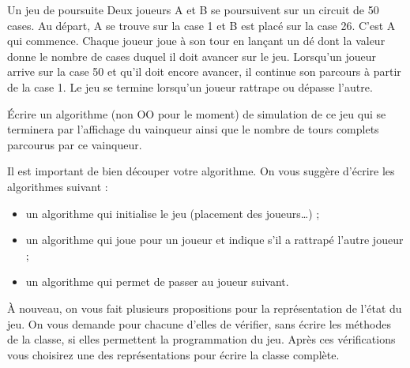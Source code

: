 \begin{Exercice}{Un jeu de poursuite}
	Deux joueurs A et B se poursuivent sur un circuit de 50 cases. 
	Au départ, A se trouve sur la case 1 et B est placé sur la case 26.
	C’est A qui commence. 
	Chaque joueur joue à son tour en lançant un dé dont la valeur 
	donne le nombre de cases duquel il doit avancer sur le jeu. 
	Lorsqu’un joueur arrive sur la case 50 et qu’il doit encore avancer, 
	il continue son parcours à partir de la case 1. 
	Le jeu se termine lorsqu’un joueur rattrape ou dépasse l’autre.

	Écrire un algorithme (non OO pour le moment) de simulation de ce jeu
	qui se terminera par l’affichage du vainqueur ainsi que le nombre de
	tours complets parcourus par ce vainqueur. 

	Il est important de bien découper votre algorithme.
	On vous suggère d'écrire les algorithmes suivant :
	\begin{itemize}
		\item 
			un algorithme  qui initialise le jeu
			(placement des joueurs\dots) ;
		\item 
			un algorithme \og{}\fg{} 
			qui joue pour un joueur et indique s'il a rattrapé l’autre joueur ;
		\item 
			un algorithme \og{}\fg{} 
			qui permet de passer au joueur suivant.
	\end{itemize}

	À nouveau, on vous fait plusieurs propositions pour la représentation
	de l'état du jeu.
	On vous demande pour chacune d'elles de vérifier, 
	sans écrire les méthodes de la classe, 
	si elles permettent la programmation du jeu. 
	Après ces vérifications vous choisirez 
	une des représentations pour écrire la classe complète.
	

\end{Exercice}
